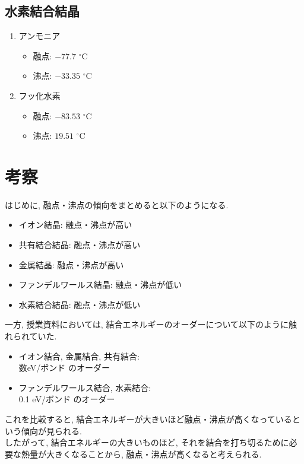 \documentclass[dvipdfmx, a4paper]{jsarticle}
\begin{document}
\begin{twocolumn}
    \subsection{水素結合結晶}
      \begin{enumerate}
        \item {} アンモニア\cite{アンモニア}
        \begin{itemize}
          \item 融点: $-77.7$ ${}^{\circ}$C
          \item 沸点: $-33.35$ ${}^{\circ}$C
        \end{itemize}
        \item {} フッ化水素\cite{フッ化水素}
        \begin{itemize}
          \item 融点: $-83.53$ ${}^{\circ}$C
          \item 沸点: $19.51$ ${}^{\circ}$C
        \end{itemize}
      \end{enumerate}

  \section{考察}
  はじめに, 融点・沸点の傾向をまとめると以下のようになる.
  \begin{itemize}
    \item イオン結晶: 融点・沸点が高い
    \item 共有結合結晶: 融点・沸点が高い
    \item 金属結晶: 融点・沸点が高い
    \item ファンデルワールス結晶: 融点・沸点が低い
    \item 水素結合結晶: 融点・沸点が低い
  \end{itemize}
  一方, 授業資料においては, 結合エネルギーのオーダーについて以下のように触れられていた. 
  \begin{itemize}
    \item イオン結合, 金属結合, 共有結合: \\数eV/ボンド のオーダー
    \item ファンデルワールス結合, 水素結合: \\0.1 eV/ボンド のオーダー
  \end{itemize}
  これを比較すると, 結合エネルギーが大きいほど融点・沸点が高くなっているという傾向が見られる. \\
  したがって, 結合エネルギーの大きいものほど, それを結合を打ち切るために必要な熱量が大きくなることから, 融点・沸点が高くなると考えられる. 
  \end{twocolumn}
\end{document}
